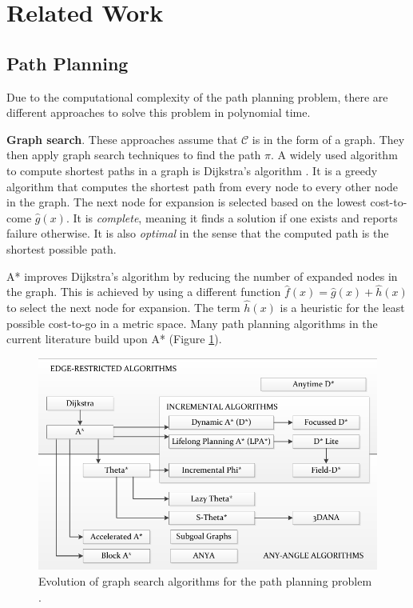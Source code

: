 \documentclass[11pt,twocolumn]{article}
\begin{document}
\section*{Related Work}
\subsection*{Path Planning} Due to the computational complexity of the
path planning problem, there are different approaches to solve this
problem in polynomial time.

\textbf{Graph search}. These approaches assume that \(\mathcal{C}\) is
in the form of a graph. They then apply graph search techniques to
find the path \(\pi\). A widely used algorithm to compute shortest
paths in a graph is Dijkstra's algorithm
\cite{dijkstraNoteTwoProblems1959}. It is a greedy algorithm that
computes the shortest path from every node to every other node in the
graph. The next node for expansion is selected based on the lowest
cost-to-come \(\hat g(x)\). It is \textit{complete}, meaning it finds
a solution if one exists and reports failure otherwise. It is also
\textit{optimal} in the sense that the computed path is the shortest
possible path.

A* \cite{hartFormalBasisHeuristic1968} improves Dijkstra's algorithm
by reducing the number of expanded nodes in the graph. This is
achieved by using a different function
\(\hat f(x) = \hat g(x) + \hat h(x)\) to select the next node for
expansion. The term \(\hat h(x)\) is a heuristic for the least
possible cost-to-go in a metric space. Many path planning algorithms
in the current literature build upon A* (Figure
\ref{fig:graph-search}).

\begin{figure}[h] \centering
  \includegraphics[scale=.35]{graph_search_algorithms}
  \caption{Evolution of graph search algorithms for the path planning
    problem \cite{sanchez-ibanezPathPlanningAutonomous2021}.}
  \label{fig:graph-search}
\end{figure}
\end{document}
